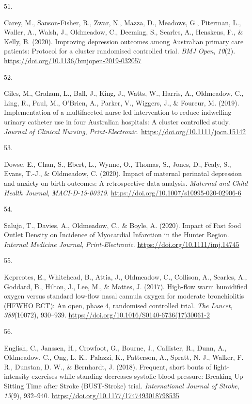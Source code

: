\documentclass[11pt, a4paper]{awesome-cv}
\newlength{\csllabelwidth}
\newcommand{\CSLLeftMargin}[1]{\parbox[t]{\csllabelwidth}{#1}}
\newcommand{\CSLRightInline}[1]{\parbox[t]{\linewidth - \csllabelwidth}{#1}}
\begin{document}
\leavevmode\hypertarget{ref-carey_improving_2020}{}%
\CSLLeftMargin{51. }
\CSLRightInline{Carey, M., Sanson-Fisher, R., Zwar, N., Mazza, D.,
Meadows, G., Piterman, L., Waller, A., Walsh, J., Oldmeadow, C.,
Deeming, S., Searles, A., Henskens, F., \& Kelly, B. (2020). Improving
depression outcomes among Australian primary care patients: Protocol for
a cluster randomised controlled trial. \emph{BMJ Open}, \emph{10}(2).
\url{https://doi.org/10.1136/bmjopen-2019-032057}}

\leavevmode\hypertarget{ref-giles_implementation_2019}{}%
\CSLLeftMargin{52. }
\CSLRightInline{Giles, M., Graham, L., Ball, J., King, J., Watts, W.,
Harris, A., Oldmeadow, C., Ling, R., Paul, M., O'Brien, A., Parker, V.,
Wiggers, J., \& Foureur, M. (2019). Implementation of a multifaceted
nurse-led intervention to reduce indwelling urinary catheter use in four
Australian hospitals: A cluster controlled study. \emph{Journal of
Clinical Nursing}, \emph{Print-Electronic}.
\url{https://doi.org/10.1111/jocn.15142}}

\leavevmode\hypertarget{ref-dowse_impact_2020}{}%
\CSLLeftMargin{53. }
\CSLRightInline{Dowse, E., Chan, S., Ebert, L., Wynne, O., Thomas, S.,
Jones, D., Fealy, S., Evans, T.-J., \& Oldmeadow, C. (2020). Impact of
maternal perinatal depression and anxiety on birth outcomes: A
retrospective data analysis. \emph{Maternal and Child Health Journal},
\emph{MACI-D-19-00319}.
\url{https://doi.org/10.1007/s10995-020-02906-6}}

\leavevmode\hypertarget{ref-saluja_impact_2020}{}%
\CSLLeftMargin{54. }
\CSLRightInline{Saluja, T., Davies, A., Oldmeadow, C., \& Boyle, A.
(2020). Impact of Fast food Outlet Density on Incidence of Myocardial
Infarction in the Hunter Region. \emph{Internal Medicine Journal},
\emph{Print-Electronic}. \url{https://doi.org/10.1111/imj.14745}}

\leavevmode\hypertarget{ref-kepreotes_high-flow_2017}{}%
\CSLLeftMargin{55. }
\CSLRightInline{Kepreotes, E., Whitehead, B., Attia, J., Oldmeadow, C.,
Collison, A., Searles, A., Goddard, B., Hilton, J., Lee, M., \& Mattes,
J. (2017). High-flow warm humidified oxygen versus standard low-flow
nasal cannula oxygen for moderate bronchiolitis (HFWHO RCT): An open,
phase 4, randomised controlled trial. \emph{The Lancet},
\emph{389}(10072), 930--939.
\url{https://doi.org/10.1016/S0140-6736(17)30061-2}}

\leavevmode\hypertarget{ref-english_frequent_2018}{}%
\CSLLeftMargin{56. }
\CSLRightInline{English, C., Janssen, H., Crowfoot, G., Bourne, J.,
Callister, R., Dunn, A., Oldmeadow, C., Ong, L. K., Palazzi, K.,
Patterson, A., Spratt, N. J., Walker, F. R., Dunstan, D. W., \&
Bernhardt, J. (2018). Frequent, short bouts of light-intensity exercises
while standing decreases systolic blood pressure: Breaking Up Sitting
Time after Stroke (BUST-Stroke) trial. \emph{International Journal of
Stroke}, \emph{13}(9), 932--940.
\url{https://doi.org/10.1177/1747493018798535}}
\end{document}
